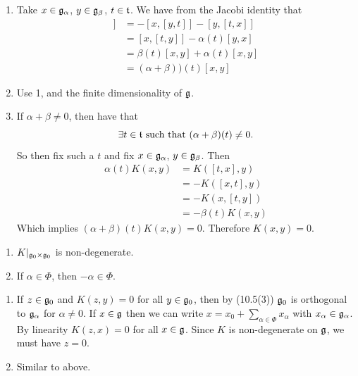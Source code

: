 \documentclass{article}
\begin{document}
\proof \hspace{0.1cm} \begin{enumerate}
    \item Take $x \in \mathfrak{g}_{\alpha}$, $y \in \mathfrak{g}_{\beta}$, $t \in \mathfrak{t}$. We have from the Jacobi identity that 
    \begin{align*} 
        [t,[x,y]] &= -[x,[y,t]] - [y,[t,x]]\\
        &= [x,[t,y]] - \alpha(t)[y,x]\\
        &= \beta(t)[x,y] + \alpha(t)[x,y]\\
        &= (\alpha + \beta))(t)[x,y]
    \end{align*}
    \item Use 1, and the finite dimensionality of $\mathfrak{g}$.
    \item If $\alpha + \beta \neq 0$, then have that \[ \exists t \in \mathfrak{t} \text{ such that } (\alpha + \beta)(t) \neq 0.\] So then fix such a $t$ and fix $x \in \mathfrak{g}_{\alpha}$, $y \in \mathfrak{g}_{\beta}$. Then 
    \begin{align*}
        \alpha(t)K(x,y) &= K([t,x],y)\\
        &= -K([x,t],y)\\
        &= -K(x,[t,y])\\
        &= -\beta(t)K(x,y)
    \end{align*}
    Which implies $(\alpha + \beta)(t)K(x,y)=0$. Therefore $K(x,y)=0$.
\end{enumerate}
\endproof
\begin{corr}{}\hspace{0.1cm}
    \begin{enumerate}
        \item $K|_{\mathfrak{g}_{0} \times \mathfrak{g}_{0}}$ is non-degenerate.
        \item If $\alpha \in \Phi$, then $-\alpha \in \Phi$.
    \end{enumerate}
\end{corr}
\proof \hspace{0.1cm} \begin{enumerate} \item If $z \in \mathfrak{g}_{0}$ and $K(z,y)=0$ for all $y \in \mathfrak{g}_{0}$, then by (10.5(3)) $\mathfrak{g}_{0}$ is orthogonal to $\mathfrak{g}_{\alpha}$ for $\alpha \neq 0$. If $x \in \mathfrak{g}$ then we can write $x=x_{0} + \sum_{\alpha \in \Phi}x_{\alpha}$ with $x_{\alpha} \in \mathfrak{g}_{\alpha}$. By linearity $K(z,x)=0$ for all $x \in \mathfrak{g}$. Since $K$ is non-degenerate on $\mathfrak{g}$, we must have $z=0$.
    \item Similar to above.
\end{enumerate}
\end{document}
